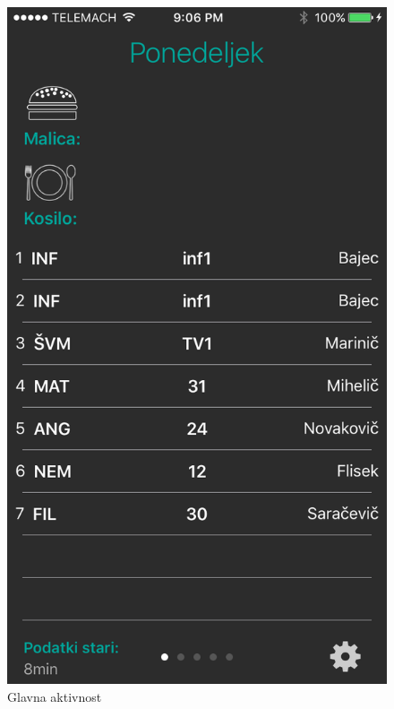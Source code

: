 \begin{figure}[!ht]
	\begin{minipage}{0.45\linewidth}
		\includegraphics[width=\linewidth]{images/main_view.png}
		\caption{Glavna aktivnost}\label{fig:main_view}
	\end{minipage}\hfill
	\begin{minipage}{0.45\linewidth}

\end{minipage}
\end{figure}
